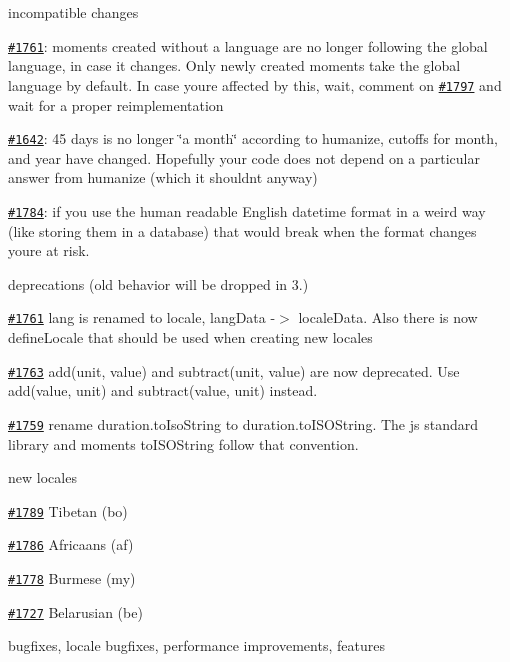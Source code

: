 \begin{DoxyItemize}
\item incompatible changes
\begin{DoxyItemize}
\item \href{https://github.com/moment/moment/issues/1761}{\tt \#1761}\+: moments created without a language are no longer following the global language, in case it changes. Only newly created moments take the global language by default. In case you\textquotesingle{}re affected by this, wait, comment on \href{https://github.com/moment/moment/issues/1797}{\tt \#1797} and wait for a proper reimplementation
\item \href{https://github.com/moment/moment/issues/1642}{\tt \#1642}\+: 45 days is no longer \char`\"{}a month\char`\"{} according to humanize, cutoffs for month, and year have changed. Hopefully your code does not depend on a particular answer from humanize (which it shouldn\textquotesingle{}t anyway)
\item \href{https://github.com/moment/moment/issues/1784}{\tt \#1784}\+: if you use the human readable English datetime format in a weird way (like storing them in a database) that would break when the format changes you\textquotesingle{}re at risk.
\end{DoxyItemize}
\item deprecations (old behavior will be dropped in 3.)
\begin{DoxyItemize}
\item \href{https://github.com/moment/moment/issues/1761}{\tt \#1761} {\ttfamily lang} is renamed to {\ttfamily locale}, {\ttfamily lang\+Data} -\/$>$ {\ttfamily locale\+Data}. Also there is now {\ttfamily define\+Locale} that should be used when creating new locales
\item \href{https://github.com/moment/moment/issues/1763}{\tt \#1763} {\ttfamily add(unit, value)} and {\ttfamily subtract(unit, value)} are now deprecated. Use {\ttfamily add(value, unit)} and {\ttfamily subtract(value, unit)} instead.
\item \href{https://github.com/moment/moment/issues/1759}{\tt \#1759} rename {\ttfamily duration.\+to\+Iso\+String} to {\ttfamily duration.\+to\+I\+S\+O\+String}. The js standard library and moment\textquotesingle{}s {\ttfamily to\+I\+S\+O\+String} follow that convention.
\end{DoxyItemize}
\item new locales
\begin{DoxyItemize}
\item \href{https://github.com/moment/moment/issues/1789}{\tt \#1789} Tibetan (bo)
\item \href{https://github.com/moment/moment/issues/1786}{\tt \#1786} Africaans (af)
\item \href{https://github.com/moment/moment/issues/1778}{\tt \#1778} Burmese (my)
\item \href{https://github.com/moment/moment/issues/1727}{\tt \#1727} Belarusian (be)
\end{DoxyItemize}
\item bugfixes, locale bugfixes, performance improvements, features
\end{DoxyItemize}

